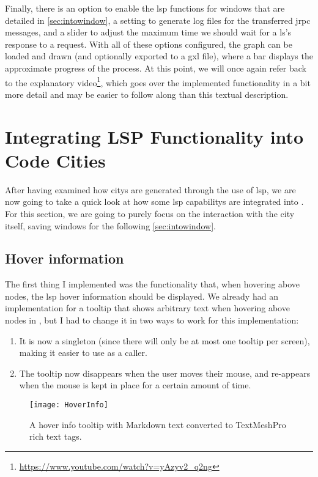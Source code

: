 \documentclass[../thesis]{subfiles}
\begin{document}
Finally, there is an option to enable the \gls{lsp} functions for \glspl{window} that are detailed in \cref{sec:intowindow}, a setting to generate log files for the transferred \gls{jrpc} messages, and a slider to adjust the maximum time we should wait for a \gls{ls}'s response to a request.
With all of these options configured, the graph can be loaded and drawn (and optionally exported to a \gls{gxl} file), where a bar displays the approximate progress of the process.
At this point, we will once again refer back to the explanatory video\footnote{\url{https://www.youtube.com/watch?v=yAzyv2_q2ng}},
which goes over the implemented functionality in a bit more detail and may be easier to follow along than this textual description.

\section{Integrating LSP Functionality into Code Cities}\label{sec:intocity}
After having examined how \glspl{city} are generated through the use of \gls{lsp}, we are now going to take a quick look at how some \gls{lsp} \glspl{capability} are integrated into \SEE{}.
For this section, we are going to purely focus on the interaction with the city itself, saving \glspl{window} for the following \cref{sec:intowindow}.

\subsection{Hover information}\label{subsec:hover}
The first thing I implemented was the functionality that, when hovering above nodes, the \gls{lsp} hover information should be displayed.
We already had an implementation for a tooltip that shows arbitrary text when hovering above nodes in \SEE{}, but I had to change it in two ways to work for this implementation:
\begin{enumerate}
	\item It is now a \gls{singleton} (since there will only be at most one tooltip per screen), making it easier to use as a caller.
	\item The tooltip now disappears when the user moves their mouse, and re-appears when the mouse is kept in place for a certain amount of time.
\end{enumerate}

\begin{figure}
	\begin{center}
		\texttt{[image: HoverInfo]}
	\end{center}
	\caption{A hover info tooltip with Markdown text converted to TextMeshPro rich text tags.}\label{fig:hoverinfo}
\end{figure}
\end{document}
